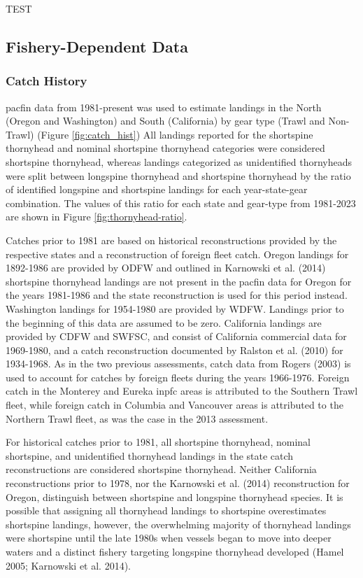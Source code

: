 \documentclass[11pt,
  english,
  letterpaper,
]{article}
\begin{document}
TEST

\hypertarget{fishery-dependent-data}{%
\subsection{Fishery-Dependent Data}\label{fishery-dependent-data}}

\hypertarget{catch-history}{%
\subsubsection{Catch History}\label{catch-history}}

\Gls{pacfin} data from 1981-present was used to estimate landings in the North (Oregon and Washington) and South (California) by gear type (Trawl and Non-Trawl) (Figure \ref{fig:catch_hist}) All landings reported for the shortspine thornyhead and nominal shortspine thornyhead categories were considered shortspine thornyhead, whereas landings categorized as unidentified thornyheads were split between longspine thornyhead and shortspine thornyhead by the ratio of identified longspine and shortspine landings for each year-state-gear combination. The values of this ratio for each state and gear-type from 1981-2023 are shown in Figure \ref{fig:thornyhead-ratio}.

Catches prior to 1981 are based on historical reconstructions provided by the respective states and a reconstruction of foreign fleet catch. Oregon landings for 1892-1986 are provided by ODFW and outlined in Karnowski et al. (2014) shortspine thornyhead landings are not present in the \gls{pacfin} data for Oregon for the years 1981-1986 and the state reconstruction is used for this period instead. Washington landings for 1954-1980 are provided by WDFW. Landings prior to the beginning of this data are assumed to be zero. California landings are provided by CDFW and SWFSC, and consist of California commercial data for 1969-1980, and a catch reconstruction documented by Ralston et al. (2010) for 1934-1968. As in the two previous assessments, catch data from Rogers (2003) is used to account for catches by foreign fleets during the years 1966-1976. Foreign catch in the Monterey and Eureka \gls{inpfc} areas is attributed to the Southern Trawl fleet, while foreign catch in Columbia and Vancouver areas is attributed to the Northern Trawl fleet, as was the case in the 2013 assessment.

For historical catches prior to 1981, all shortspine thornyhead, nominal shortspine, and unidentified thornyhead landings in the state catch reconstructions are considered shortspine thornyhead. Neither California reconstructions prior to 1978, nor the Karnowski et al. (2014) reconstruction for Oregon, distinguish between shortspine and longspine thornyhead species. It is possible that assigning all thornyhead landings to shortspine overestimates shortspine landings, however, the overwhelming majority of thornyhead landings were shortspine until the late 1980s when vessels began to move into deeper waters and a distinct fishery targeting longspine thornyhead developed (Hamel 2005; Karnowski et al. 2014).
\end{document}
